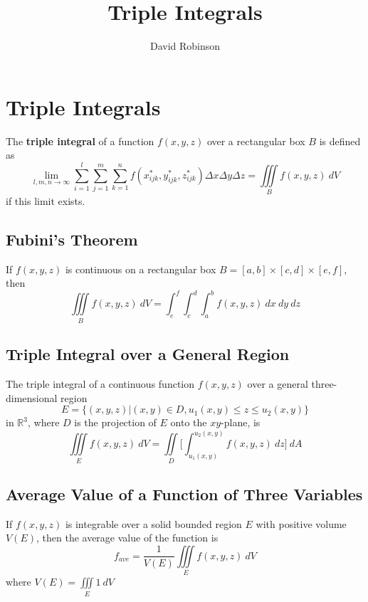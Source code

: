 \documentclass{article}
\title{Triple Integrals}
\author{David Robinson}
\date{}
\begin{document}
\maketitle

\section*{Triple Integrals}

The \textbf{triple integral} of a function $f(x,y,z)$ over a rectangular box $B$ is defined as
\[\lim_{l,m,n\rightarrow\infty}\sum_{i=1}^l\sum_{j=1}^m\sum_{k=1}^n f(x_{ijk}^*, y_{ijk}^*, z_{ijk}^*)\Delta x\Delta y\Delta z=\iiint\limits_B f(x,y,z)\: dV\] if this limit exists.

\subsection*{Fubini's Theorem}
If $f(x,y,z)$ is continuous on a rectangular box $B=[a,b]\times[c,d]\times[e,f]$, then
\[\iiint\limits_B f(x,y,z)\: dV=\int_e^f\int_c^d\int_a^b f(x, y, z)\: dx\: dy\: dz\]

\subsection*{Triple Integral over a General Region}
The triple integral of a continuous function $f(x,y,z)$ over a general three-dimensional region
\[E=\{(x,y,z)|(x,y)\in D, u_1 (x,y)\leq z\leq u_2 (x,y)\}\]
in $\mathbb{R}^3$, where $D$ is the projection of $E$ onto the $xy$-plane, is
\[\iiint\limits_E f(x,y,z)\: dV=\iint\limits_D \Bigg[\int_{u_1 (x,y)}^{u_2(x,y)} f(x,y,z)\: dz\Bigg]\: dA\]

\subsection*{Average Value of a Function of Three Variables}
If $f(x,y,z)$ is integrable over a solid bounded region $E$ with positive volume $V(E)$, then the average value of the function is
\[f_{ave}=\frac{1}{V(E)}\iiint\limits_E f(x,y,z)\: dV\] where $V(E)=\iiint\limits_E 1\: dV$
\end{document}
